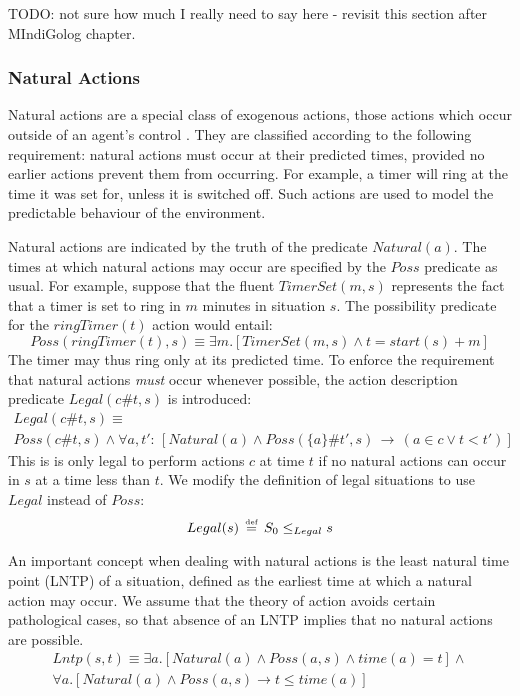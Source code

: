 TODO: not sure how much I really need to say here - revisit this section
after MIndiGolog chapter.


\subsubsection{Natural Actions}

Natural actions are a special class of exogenous actions, those actions
which occur outside of an agent's control \citep{reiter96sc_nat_conc}.
They are classified according to the following requirement: natural
actions must occur at their predicted times, provided no earlier actions
prevent them from occurring. For example, a timer will ring at the
time it was set for, unless it is switched off. Such actions are used
to model the predictable behaviour of the environment.

Natural actions are indicated by the truth of the predicate $Natural(a)$.
The times at which natural actions may occur are specified by the
$Poss$ predicate as usual. For example, suppose that the fluent $TimerSet(m,s)$
represents the fact that a timer is set to ring in $m$ minutes in
situation $s$. The possibility predicate for the $ringTimer(t)$
action would entail:\[
Poss(ringTimer(t),s)\equiv\exists m.\left[TimerSet(m,s)\wedge t=start(s)+m\right]\]
 The timer may thus ring only at its predicted time. To enforce the
requirement that natural actions \emph{must} occur whenever possible,
the action description predicate $Legal(c\#t,s)$ is introduced:\begin{multline*}
Legal(c\#t,s)\equiv\\
Poss(c\#t,s)\wedge\forall a,t':\,\left[Natural(a)\wedge Poss(\{a\}\#t',s)\,\rightarrow\,\left(a\in c\vee t<t'\right)\right]\end{multline*}
 This is is only legal to perform actions $c$ at time $t$ if no
natural actions can occur in $s$ at a time less than $t$. We modify
the definition of legal situations to use $Legal$ instead of $Poss$:\[
Legal(s)\,\stackrel{\mbox{\tiny def}}{=}\, S_{0}\leq_{Legal}s\]


An important concept when dealing with natural actions is the least
natural time point (LNTP) of a situation, defined as the earliest
time at which a natural action may occur. We assume that the theory
of action avoids certain pathological cases, so that absence of an
LNTP implies that no natural actions are possible.\begin{multline*}
Lntp(s,t)\equiv\exists a.\left[Natural(a)\wedge Poss(a,s)\wedge time(a)=t\right]\wedge\\
\forall a.\left[Natural(a)\wedge Poss(a,s)\rightarrow t\leq time(a)\right]\end{multline*}



